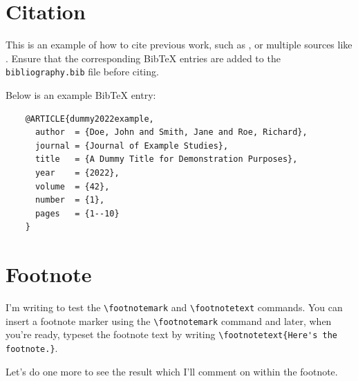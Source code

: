 \section{Citation}
\begin{paragraph}
This is an example of how to cite previous work, such as \cite{min2net}, or multiple sources like \cite{hu79, somework2020, tonio_paper}. Ensure that the corresponding BibTeX entries are added to the \texttt{bibliography.bib} file before citing.

Below is an example BibTeX entry:

\begin{verbatim}
    @ARTICLE{dummy2022example,
      author  = {Doe, John and Smith, Jane and Roe, Richard},
      journal = {Journal of Example Studies}, 
      title   = {A Dummy Title for Demonstration Purposes}, 
      year    = {2022},
      volume  = {42},
      number  = {1},
      pages   = {1--10}
    }
    \end{verbatim}

\end{paragraph}



\section{Footnote}

\begin{paragraph}
I'm writing to test the \verb|\footnotemark| and \verb|\footnotetext| commands. 
You can insert a footnote marker using the \verb|\footnotemark|\footnotemark{}
command and later, when you're ready, typeset the footnote text by writing 
\verb|\footnotetext{Here's the footnote.}|. 

Let's do one more to see the result\footnotemark{} which I'll comment on within the
footnote.
\end{paragraph}